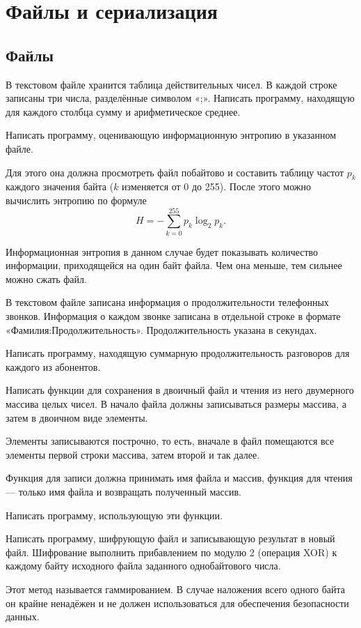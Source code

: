 \section{Файлы и сериализация}

\subsection{Файлы}

\task В текстовом файле хранится таблица действительных чисел. В
каждой строке записаны три числа, разделённые символом «;». Написать
программу, находящую для каждого столбца сумму и арифметическое
среднее.

\task Написать программу, оценивающую информационную энтропию в
указанном файле.

Для этого она должна просмотреть файл побайтово и составить таблицу
частот $p_k$ каждого значения байта ($k$ изменяется от 0 до
255). После этого можно вычислить энтропию по формуле
\[
H = - \sum_{k=0}^{255} p_k \log_2 p_k.
\]

Информационная энтропия в данном случае будет показывать количество
информации, приходящейся на один байт файла. Чем она меньше, тем
сильнее можно сжать файл.

\task В текстовом файле записана информация о продолжительности
телефонных звонков.  Информация о каждом звонке записана в отдельной
строке в формате «Фамилия:Продолжительность». Продолжительность
указана в секундах.

Написать программу, находящую суммарную продолжительность разговоров
для каждого из абонентов.

\task Написать функции для сохранения в двоичный файл и чтения из него
двумерного массива целых чисел. В начало файла должны записываться
размеры массива, а затем в двоичном виде элементы.

Элементы записываются построчно, то есть, вначале в файл помещаются
все элементы первой строки массива, затем второй и так далее.

Функция для записи должна принимать имя файла и массив, функция для
чтения — только имя файла и возвращать полученный массив.

Написать программу, использующую эти функции.

\task Написать программу, шифрующую файл и записывающую результат в
новый файл. Шифрование выполнить прибавлением по модулю 2 (операция
XOR) к каждому байту исходного файла заданного однобайтового числа.

Этот метод называется гаммированием. В случае наложения всего одного
байта он крайне ненадёжен и не должен использоваться для обеспечения
безопасности данных.

